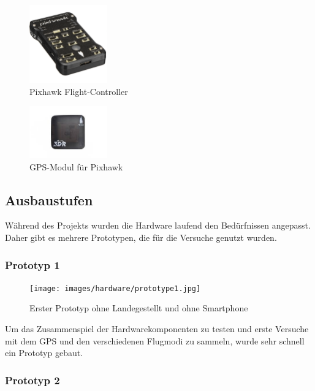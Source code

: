\begin{figure}[h]
\centering
\includegraphics[width=0.3\textwidth] {images/hardware/pixhawk.jpg} 
\caption{Pixhawk Flight-Controller}
\label{fig:pixhawk}
\end{figure}

\begin{figure}[h]
\centering
\includegraphics[width=0.3\textwidth] {images/hardware/gps-module.jpg} 
\caption{GPS-Modul für Pixhawk}
\label{fig:gps-module}
\end{figure}

\subsection{Ausbaustufen}

Während des Projekts wurden die Hardware laufend den Bedürfnissen angepasst. Daher gibt es mehrere Prototypen, die für die Versuche genutzt wurden.

\subsubsection{Prototyp 1}

\begin{figure}[H]
\centering
\texttt{[image: images/hardware/prototype1.jpg]}
\caption{Erster Prototyp ohne Landegestellt und ohne Smartphone}
\label{fig:prototyp-1}
\end{figure}

Um das Zusammenspiel der Hardwarekomponenten zu testen und erste Versuche mit dem GPS und den verschiedenen Flugmodi zu sammeln, wurde sehr schnell ein Prototyp gebaut.

\subsubsection{Prototyp 2}

